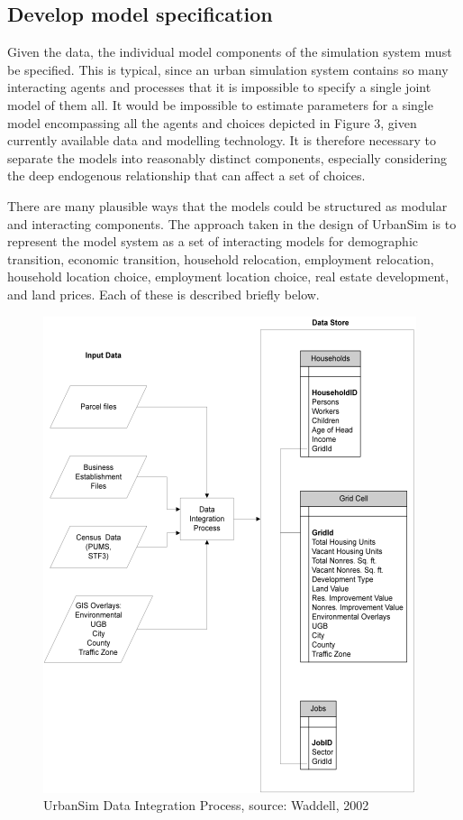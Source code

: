 \subsection{Develop model specification}

Given the data, the individual model components of the simulation system must be specified. This is typical, since an urban simulation system contains so many interacting agents and processes that it is impossible to specify a single joint model of them all. It would be impossible to estimate parameters for a single model encompassing all the agents and choices depicted in Figure 3, given currently available data and modelling technology.  It is therefore necessary to separate the models into reasonably distinct components, especially considering the deep endogenous relationship that can affect a set of choices.

There are many plausible ways that the models could be structured as modular and interacting components. The approach taken in the design of UrbanSim is to represent the model system as a set of interacting models for demographic transition, economic transition, household relocation, employment relocation, household location choice, employment location choice, real estate development, and land prices.  Each of these is described briefly below.


\begin{figure}[htp]
\begin{center}
\includegraphics[scale=1.0]{graphics/data-integration.png}
\end{center}
\caption{\label{fig:data-integration}{UrbanSim Data Integration Process, source: Waddell, 2002}}
\end{figure}

